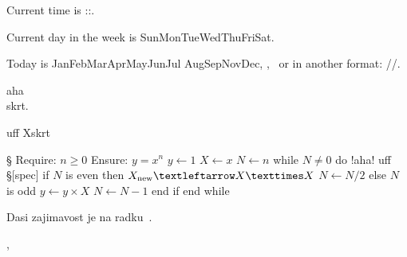\TEST \sethours \setseconds \setweekday \hours \minutes \seconds 

\sethours \setseconds
Current time is \the\hours:\Othe\minutes:\Othe\seconds.

\setweekday
Current day in the week is
\ifcase\weekday Sun\or Mon\or Tue\or Wed\or Thu\or Fri\or Sat\fi.

Today is
\ifcase\month\or Jan\or Feb\or Mar\or Apr\or May\or Jun\or Jul\or
   Aug\or Sep\or Nov\or Dec\fi, \the\day, \the\year
\ or in another format: \the\year/\Othe\month/\Othe\day.

\TEST \showpglists


\TEST \runsystem

\runsystem{}

\TEST \cancel

aha\cancel\\{skrt}.

uff \cancel X{skrt}

\TEST \algol

\begtt \ttlineref § \algol
Require: $n ≥ 0$
Ensure: $y = x^n$
   $y ← 1$
   $X ← x$
   $N ← n$
   while $N ≠ 0$ do !aha! uff §[spec]
      if $N$ is even then
         $X_{\rm new} ← X × X$
         $N ← N/2$
      else {$N$ is odd}
         $y ← y × X$
         $N ← N − 1$
      end if
   end while
\endtt

Dasi zajimavost je na radku~\lref[spec].

\TEST \correctvsize

\the\vsize, \correctvsize \the\vsize

\bye
